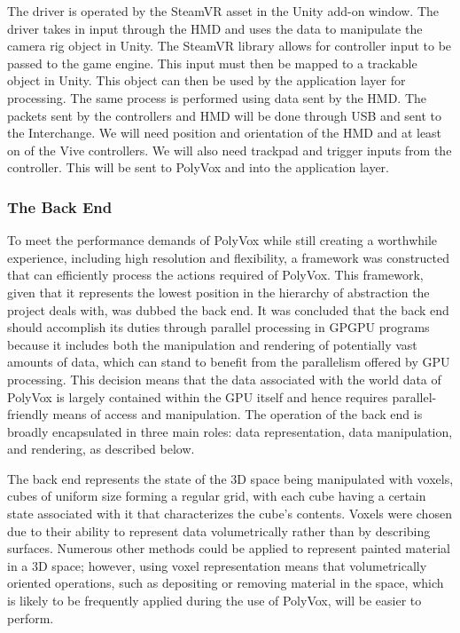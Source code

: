 \documentclass[onecolumn, draftclsnofoot,10pt, compsoc]{IEEEtran}
\newcounter{threesection}[subsubsection]
\newcounter{foursection}[threesection]
\begin{document}
The driver is operated by the SteamVR asset in the Unity add-on window.
The driver takes in input through the HMD and uses the data to manipulate the camera rig object in Unity.
The SteamVR library allows for controller input to be passed to the game engine.
This input must then be mapped to a trackable object in Unity.
This object can then be used by the application layer for processing.
The same process is performed using data sent by the HMD.
The packets sent by the controllers and HMD will be done through USB and sent to the Interchange.
We will need position and orientation of the HMD and at least on of the Vive controllers.
We will also need trackpad and trigger inputs from the controller.
This will be sent to PolyVox and into the application layer.


\subsubsection{The Back End}


To meet the performance demands of PolyVox while still creating a worthwhile experience, including high resolution and flexibility, a framework was constructed that can efficiently process the actions required of PolyVox.
This framework, given that it represents the lowest position in the hierarchy of abstraction the project deals with, was dubbed the back end.
It was concluded that the back end should accomplish its duties through parallel processing in GPGPU programs because it includes both the manipulation and rendering of potentially vast amounts of data, which can stand to benefit from the parallelism offered by GPU processing.
This decision means that the data associated with the world data of PolyVox is largely contained within the GPU itself and hence requires parallel-friendly means of access and manipulation.
The operation of the back end is broadly encapsulated in three main roles: data representation, data manipulation, and rendering, as described below.


The back end represents the state of the 3D space being manipulated with voxels, cubes of uniform size forming a regular grid, with each cube having a certain state associated with it that characterizes the cube’s contents.
Voxels were chosen due to their ability to represent data volumetrically rather than by describing surfaces.
Numerous other methods could be applied to represent painted material in a 3D space;
however, using voxel representation means that volumetrically oriented operations, such as depositing or removing material in the space, which is likely to be frequently applied during the use of PolyVox, will be easier to perform.
\end{document}
